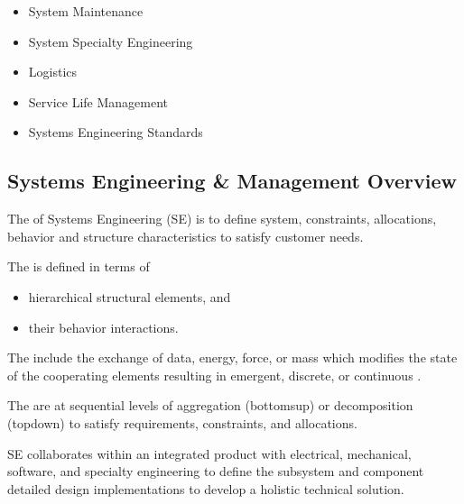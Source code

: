 \documentclass[letterpaper,10pt,english]{jupyterBook}
\begin{document}
\begin{itemize}
\item {} 
\sphinxAtStartPar
System Maintenance

\item {} 
\sphinxAtStartPar
System Specialty Engineering

\item {} 
\sphinxAtStartPar
Logistics

\item {} 
\sphinxAtStartPar
Service Life Management

\item {} 
\sphinxAtStartPar
Systems Engineering Standards

\end{itemize}


\subsection{Systems Engineering \& Management Overview}
\label{\detokenize{SE/sebok:systems-engineering-management-overview}}
\sphinxAtStartPar
The  of Systems Engineering (SE) is to define system, constraints, allocations, behavior and structure characteristics to satisfy customer needs.

\sphinxAtStartPar
The  is defined in terms of
\begin{itemize}
\item {} 
\sphinxAtStartPar
hierarchical structural elements, and

\item {} 
\sphinxAtStartPar
their behavior interactions.

\end{itemize}

\sphinxAtStartPar
The  include the exchange of data, energy, force, or mass which modifies the state of the cooperating elements resulting in emergent, discrete, or continuous .

\sphinxAtStartPar
The  are at sequential levels of aggregation (bottoms\sphinxhyphen{}up) or decomposition (top\sphinxhyphen{}down) to satisfy requirements, constraints, and allocations.

\sphinxAtStartPar
SE collaborates within an integrated product  with electrical, mechanical, software, and specialty engineering to define the subsystem and component detailed design implementations to develop a holistic technical solution.
\end{document}
